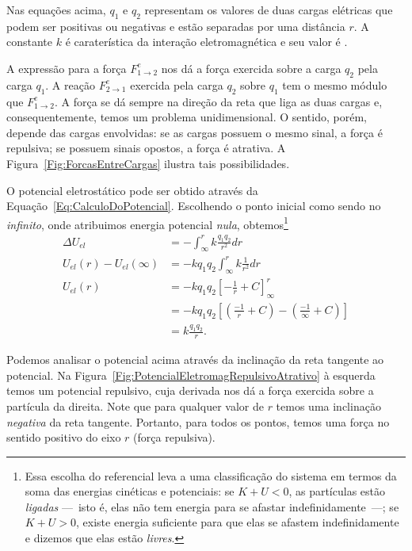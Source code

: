 \noindent{}Nas equações acima, $q_1$ e $q_2$ representam os valores de duas cargas elétricas que podem ser positivas ou negativas e estão separadas por uma distância $r$. A constante $k$ é caraterística da interação eletromagnética e seu valor é .

A expressão para a força $F_{1\to 2}^e$ nos dá a força exercida sobre a carga $q_2$ pela carga $q_1$. A reação $F_{2\to 1}^e$ exercida pela carga $q_2$ sobre $q_1$ tem o mesmo módulo que $F_{1\to 2}^e$. A força se dá sempre na direção da reta que liga as duas cargas e, consequentemente, temos um problema unidimensional. O sentido, porém, depende das cargas envolvidas: se as cargas possuem o mesmo sinal, a força é repulsiva; se possuem sinais opostos, a força é atrativa. A Figura~\ref{Fig:ForcasEntreCargas} ilustra tais possibilidades.

O potencial eletrostático  pode ser obtido através da Equação~\eqref{Eq:CalculoDoPotencial}. Escolhendo o ponto inicial como sendo no \emph{infinito}, onde atribuimos energia potencial \emph{nula}, obtemos\footnote[][-1cm]{Essa escolha do referencial leva a uma classificação do sistema em termos da soma das energias cinéticas e potenciais: se $K + U < 0$, as partículas estão \emph{ligadas} ---~isto é, elas não tem energia para se afastar indefinidamente~---; se $K + U > 0$, existe energia suficiente para que elas se afastem indefinidamente e dizemos que elas estão \emph{livres}.} 
\begin{align}
    \Delta U_{el} &= - \int_\infty^r k\frac{q_1q_2}{r^2} dr \\
    U_{el}(r) - U_{el}(\infty) &= -k q_1 q_2 \int_\infty^r k\frac{1}{r^2} dr \\
    U_{el}(r) &= -k q_1 q_2 \left[-\frac{1}{r} + C\right]_\infty^r \\
    &= -k q_1 q_2 \left[\left(\frac{-1}{r} + C \right) - \left(\frac{-1}{\infty} + C\right)\right] \\
    &= k\frac{q_1 q_2}{r}.
\end{align}

Podemos analisar o potencial acima através da inclinação da reta tangente ao potencial. Na Figura~\ref{Fig:PotencialEletromagRepulsivoAtrativo} à esquerda temos um potencial repulsivo, cuja derivada nos dá a força exercida sobre a partícula da direita. Note que para qualquer valor de $r$ temos uma inclinação \emph{negativa} da reta tangente. Portanto, para todos os pontos, temos uma força no sentido positivo do eixo $r$ (força repulsiva).

